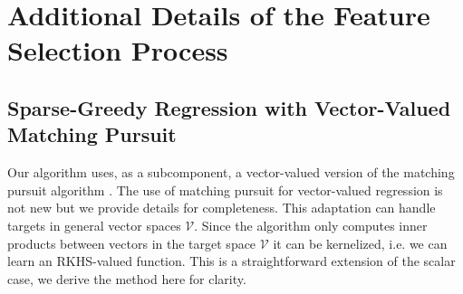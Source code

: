 \documentclass[letterpaper]{article}
\newcommand{\MallatMatchingPursuit}{DBLP:journals/tsp/MallatZ93}
\newcommand{\LeverPoliciesInRKHS}{DBLP:conf/aistats/LeverS15}
\newcommand{\cV}{{\mathcal V}}
\begin{document}
\section{Additional Details of the Feature Selection Process}\label{MatchingPursuit}

\subsection{Sparse-Greedy Regression with Vector-Valued Matching Pursuit}

Our algorithm uses, as a subcomponent, a vector-valued version of the matching pursuit algorithm \citep{\MallatMatchingPursuit}. The use of matching pursuit for vector-valued regression is not new \citep[see e.g.][]{\LeverPoliciesInRKHS} but we provide details for completeness. This adaptation can handle targets in general vector spaces $\cV$. Since the algorithm only computes inner products between vectors in the target space $\cV$ it can be kernelized, i.e. we can learn an RKHS-valued function. This is a straightforward extension of the scalar case, we derive the method here for clarity.
\end{document}
